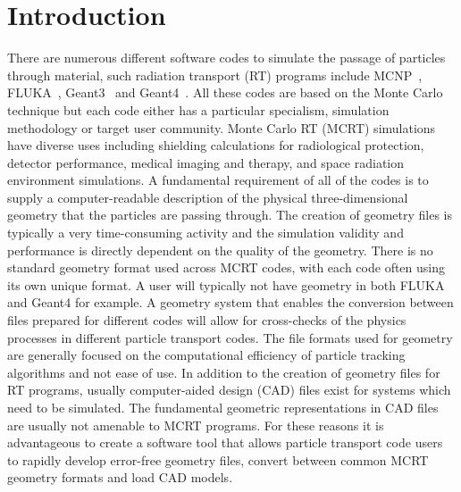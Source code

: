 \documentclass[final,5p,times,twocolumn]{elsarticle}
\begin{document}
\begin{small}

\end{small}

\section{Introduction} \label{sec:introduction}
There are numerous different software codes to simulate the passage of particles through material, such radiation transport (RT) programs
include MCNP~\cite{Mcnp_Werner}, FLUKA~\cite{Fluka_Ferrari,Fluka_Bohlen}, Geant3~\cite{Geant3_Brun} and Geant4~\cite{Geant4_Agostinelli}.
All these codes are based on the Monte Carlo technique but each code either has a particular specialism, simulation methodology or target user community.
 Monte Carlo RT (MCRT) simulations have diverse uses including shielding calculations for radiological protection, detector performance, medical
imaging and therapy, and space radiation environment simulations. A fundamental requirement of all of the codes is to supply a
computer-readable description of the  physical three-dimensional geometry that  the particles are passing through.  The creation of geometry files is
typically a very time-consuming activity and the simulation validity and performance is directly dependent on the quality of the geometry. There is no
standard geometry format used across MCRT codes, with each code often using its own unique format. A user will typically not have geometry in both FLUKA and Geant4 for example. A geometry system
that enables the conversion between files prepared for different codes will allow for cross-checks of the physics processes in different particle transport
 codes.  The file formats used for geometry are generally focused
 on the computational efficiency of particle tracking algorithms  and not ease of use. In addition to the creation of geometry files for RT programs, usually
 computer-aided design (CAD) files exist for systems which need to be simulated. The fundamental geometric representations in CAD files are usually not
 amenable to MCRT programs.  For these reasons it is advantageous to create a software tool that allows particle transport code users to rapidly develop
 error-free geometry files, convert between common MCRT geometry formats and load CAD models.
\end{document}
